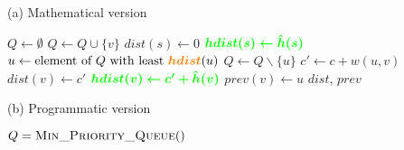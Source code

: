 \begin{center}
    \begin{algorithm}[H]
        \caption[A* algorithm]{A* algorithm\\Added lines in green, changed expressions in orange, relative to Dijkstra's algorithm (Algorithm \ref{alg-dijkstra})}
        \label{alg-astar}
        \begin{minipage}[t]{0.49\linewidth}
            (a) Mathematical version
            \begin{algorithmic}[1]
                    \State $Q \gets \emptyset$
                        \State $Q \gets Q \cup \{v\}$
                    \EndFor
                    \State $dist(s) \gets 0$
                    \State $\textcolor{green}{\bm{hdist(s) \gets \hat{h}(s)}}$
                        \State $u \gets \text{element of } Q \text{ with least } \textcolor{orange}{\bm{hdist}}(u)$
                        \State $Q \gets Q \backslash \{u\}$
                            \State $c' \gets c + w(u, v)$
                                \State $dist(v) \gets c'$
                                \State $\textcolor{green}{\bm{hdist(v) \gets c'+\hat{h}(v)}}$
                                \State $prev(v) \gets u$
                            \EndIf
                        \EndFor
                    \EndWhile
                    \State \Return $dist$, $prev$
                \EndFunction
            \end{algorithmic}
        \end{minipage}
        \begin{minipage}[t]{0.49\linewidth}
            (b) Programmatic version
            \begin{algorithmic}[1]
                    \State $Q = \Call{Min\_Priority\_Queue}{ }$
                    \EndFor

\end{algorithmic}
\end{minipage}
\end{algorithm}
\end{center}
